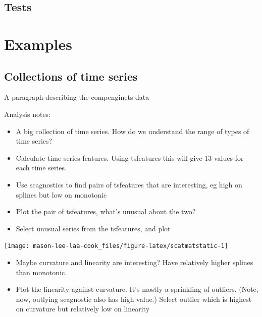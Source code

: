 \hypertarget{tests}{%
\subsection{Tests}\label{tests}}

\hypertarget{examples}{%
\section{Examples}\label{examples}}

\hypertarget{collections-of-time-series}{%
\subsection{Collections of time
series}\label{collections-of-time-series}}

A paragraph describing the compenginets data

Analysis notes:

\begin{itemize}
\tightlist
\item
  A big collection of time series. How do we understand the range of
  types of time series?
\item
  Calculate time series features. Using tsfeatures this will give 13
  values for each time series.
\item
  Use scagnostics to find pairs of tsfeatures that are interesting, eg
  high on splines but low on monotonic
\item
  Plot the pair of tsfeatures, what's unusual about the two?
\item
  Select unusual series from the tsfeatures, and plot
\end{itemize}

\begin{Schunk}

\texttt{[image: mason-lee-laa-cook\_files/figure-latex/scatmatstatic-1]} \end{Schunk}

\begin{itemize}
\tightlist
\item
  Maybe curvature and linearity are interesting? Have relatively higher
  splines than monotonic.
\item
  Plot the linearity against curvature. It's mostly a sprinkling of
  outliers. (Note, now, outlying scagnostic also has high value.) Select
  outlier which is highest on curvature but relatively low on linearity
\end{itemize}

